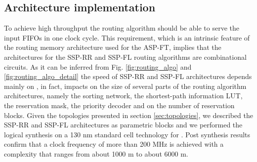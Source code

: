 \documentclass[10pt,twocolumn,journal]{IEEEtran}
\begin{document}
\subsection{Architecture implementation}
To achieve high throughput the routing algorithm should be able to serve the input FIFOs in one clock cycle. 
This requirement, which is an intrinsic feature of the routing memory architecture used for the ASP-FT,  
implies that the architectures for the SSP-RR and SSP-FL routing algorithms are combinational circuits. 
As it can be inferred from Fig. \ref{fig:routing_algo} and \ref{fig:routing_algo_detail} 
the speed of SSP-RR and SSP-FL architectures depends mainly on , in fact,  impacts on the size of several parts of the routing algorithm architectures, namely 
the sorting network, the shortest-path information LUT, the reservation mask, the priority decoder and on the number 
of reservation blocks.
Given the topologies presented in section \ref{sec:topologies}, we described the SSP-RR and SSP-FL architectures 
as parametric blocks and we performed the logical synthesis on a 130 nm standard cell technology for . 
Post synthesis results confirm that a clock frequency of more than 200 MHz is achieved with a complexity that ranges 
from about 1000 m to about 6000 m.
\end{document}
